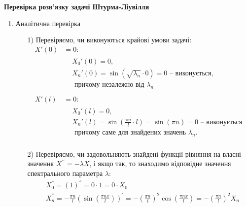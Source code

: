 \begin{center}
    \large{\textbf{Перевірка розв'язку задачі Штурма-Ліувілля}}
\end{center}

\begin{enumerate}[wide, labelindent=0pt]
    \item Аналітична перевірка
    \begin{enumerate}
        \item[1)] Перевіряємо, чи виконуються крайові умови задачі:
        \begin{equation*}
            \begin{aligned}
                X'(0) &=  0:\\
                &\begin{aligned}
                    &X_0'(0) = 0,\\
                    &X_n'(0) = \sin(\sqrt{\lambda_n} \cdot 0) = 0 \text{ -- виконується,}\\
                    &\text{ причому незалежно від }\lambda_n
                \end{aligned}\\
                \\
                X'(l) &= 0:\\
                &\begin{aligned}
                    &X_0'(l) = 0,\\
                    &X_n'(l) = \sin\left(\frac{\pi n}{l} \cdot l\right) = \sin(\pi n) = 0 \text{ -- виконується}\\
                    &\text{ причому саме для знайдених значень }\lambda_n.
                \end{aligned}\\
            \end{aligned}
        \end{equation*}
        \item[2)] Перевіряємо, чи задовольняють знайдені функції рівняння на власні значення $X^{\prime\prime} = -\lambda X$, і якщо так, то знаходимо відповідне значення спектрального параметра $\lambda$:
        \begin{equation*}
            \begin{aligned}
                &X_0^{''} = \left(1\right)^{''} = 0 \cdot 1 = 0 \cdot X_0 \\
                &X_n^{''} = -\frac{\pi n}{l} \left(\sin\left(\frac{\pi n x}{l}\right)\right)^{'} = -\left(\frac{\pi n}{l}\right)^2 \cos\left(\frac{\pi n x}{l}\right) = -\left(\frac{\pi n}{l}\right)^2 X_n

\end{aligned}
\end{equation*}
\end{enumerate}
\end{enumerate}
